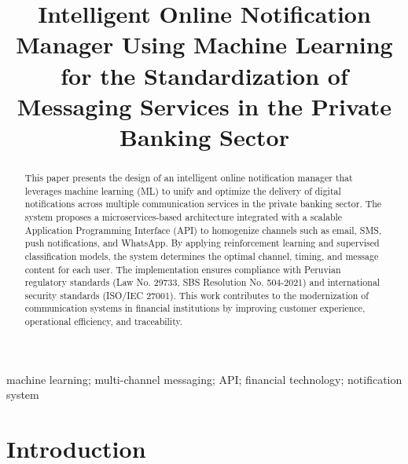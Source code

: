 \documentclass[conference]{IEEEtran}
\begin{document}
\title{Intelligent Online Notification Manager Using Machine Learning for the Standardization of Messaging Services in the Private Banking Sector}

\author{
}

\maketitle

\begin{abstract}
This paper presents the design of an intelligent online notification manager that leverages machine learning (ML) to unify and optimize the delivery of digital notifications across multiple communication services in the private banking sector. The system proposes a microservices-based architecture integrated with a scalable Application Programming Interface (API) to homogenize channels such as email, SMS, push notifications, and WhatsApp. By applying reinforcement learning and supervised classification models, the system determines the optimal channel, timing, and message content for each user. The implementation ensures compliance with Peruvian regulatory standards (Law No. 29733, SBS Resolution No. 504-2021) and international security standards (ISO/IEC 27001). This work contributes to the modernization of communication systems in financial institutions by improving customer experience, operational efficiency, and traceability.
\end{abstract}

\begin{IEEEkeywords}
machine learning; multi-channel messaging; API; financial technology; notification system
\end{IEEEkeywords}

\section{Introduction}
\end{document}
